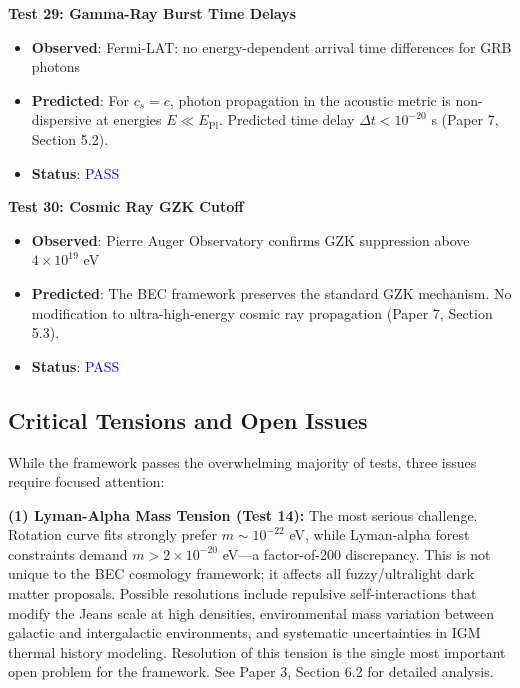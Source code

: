 \documentclass[11pt,a4paper]{article}
\theoremstyle{definition}
\theoremstyle{remark}
\begin{document}
\textbf{Test 29: Gamma-Ray Burst Time Delays}

\begin{itemize}[leftmargin=*, itemsep=0.1em]
\item \textbf{Observed}: Fermi-LAT: no energy-dependent arrival time differences for GRB photons
\item \textbf{Predicted}: For $c_s = c$, photon propagation in the acoustic metric is non-dispersive at energies $E \ll E_{\mathrm{Pl}}$. Predicted time delay $\Delta t < 10^{-20}$ s (Paper 7, Section 5.2).
\item \textbf{Status}: \textcolor{blue}{PASS}
\end{itemize}

\textbf{Test 30: Cosmic Ray GZK Cutoff}

\begin{itemize}[leftmargin=*, itemsep=0.1em]
\item \textbf{Observed}: Pierre Auger Observatory confirms GZK suppression above $4 \times 10^{19}$ eV
\item \textbf{Predicted}: The BEC framework preserves the standard GZK mechanism. No modification to ultra-high-energy cosmic ray propagation (Paper 7, Section 5.3).
\item \textbf{Status}: \textcolor{blue}{PASS}
\end{itemize}

\subsection{Critical Tensions and Open Issues}
\label{sec:critical_tensions}

While the framework passes the overwhelming majority of tests, three issues require focused attention:

\textbf{(1) Lyman-Alpha Mass Tension (Test 14):} The most serious challenge. Rotation curve fits strongly prefer $m \sim 10^{-22}$ eV, while Lyman-alpha forest constraints demand $m > 2 \times 10^{-20}$ eV---a factor-of-200 discrepancy. This is not unique to the BEC cosmology framework; it affects all fuzzy/ultralight dark matter proposals. Possible resolutions include repulsive self-interactions that modify the Jeans scale at high densities, environmental mass variation between galactic and intergalactic environments, and systematic uncertainties in IGM thermal history modeling. Resolution of this tension is the single most important open problem for the framework. See Paper 3, Section 6.2 for detailed analysis.
\end{document}
